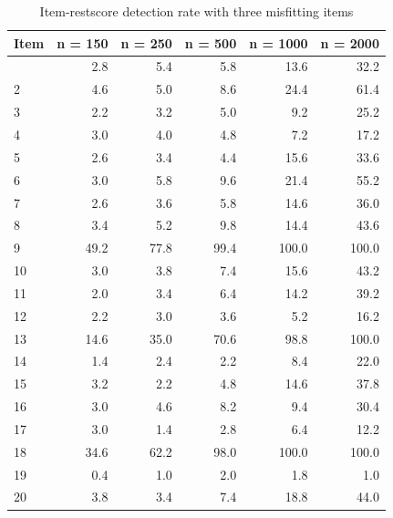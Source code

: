 \documentclass[
  letterpaper,
  DIV=11,
  numbers=noendperiod]{scrartcl}
\begin{document}
\begin{longtable}[]{@{}lrrrrr@{}}

\caption{\label{tbl-itemrestscore2}Item-restscore detection rate with
three misfitting items}

\tabularnewline

\toprule\noalign{}
Item & n = 150 & n = 250 & n = 500 & n = 1000 & n = 2000 \\
\midrule\noalign{}
\endhead
\bottomrule\noalign{}
\endlastfoot
1 & 2.8 & 5.4 & 5.8 & 13.6 & 32.2 \\
2 & 4.6 & 5.0 & 8.6 & 24.4 & 61.4 \\
3 & 2.2 & 3.2 & 5.0 & 9.2 & 25.2 \\
4 & 3.0 & 4.0 & 4.8 & 7.2 & 17.2 \\
5 & 2.6 & 3.4 & 4.4 & 15.6 & 33.6 \\
6 & 3.0 & 5.8 & 9.6 & 21.4 & 55.2 \\
7 & 2.6 & 3.6 & 5.8 & 14.6 & 36.0 \\
8 & 3.4 & 5.2 & 9.8 & 14.4 & 43.6 \\
9 & 49.2 & 77.8 & 99.4 & 100.0 & 100.0 \\
10 & 3.0 & 3.8 & 7.4 & 15.6 & 43.2 \\
11 & 2.0 & 3.4 & 6.4 & 14.2 & 39.2 \\
12 & 2.2 & 3.0 & 3.6 & 5.2 & 16.2 \\
13 & 14.6 & 35.0 & 70.6 & 98.8 & 100.0 \\
14 & 1.4 & 2.4 & 2.2 & 8.4 & 22.0 \\
15 & 3.2 & 2.2 & 4.8 & 14.6 & 37.8 \\
16 & 3.0 & 4.6 & 8.2 & 9.4 & 30.4 \\
17 & 3.0 & 1.4 & 2.8 & 6.4 & 12.2 \\
18 & 34.6 & 62.2 & 98.0 & 100.0 & 100.0 \\
19 & 0.4 & 1.0 & 2.0 & 1.8 & 1.0 \\
20 & 3.8 & 3.4 & 7.4 & 18.8 & 44.0 \\

\end{longtable}
\end{document}
